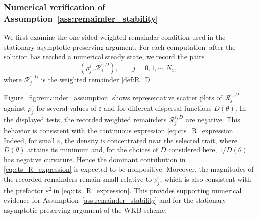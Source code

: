 \documentclass[11pt]{article}
\numberwithin{equation}{section}
\begin{document}
\subsubsection{Numerical verification of Assumption~\ref{ass:remainder_stability}}
\label{subsec:test_assumptions_new}

We first examine the one-sided weighted remainder condition used in the
stationary asymptotic-preserving argument.  
For each computation, after the solution has reached a numerical steady state,
we record the pairs
\[
    \left(\rho_j^\varepsilon,\mathcal R_j^{\varepsilon,D}\right),
    \qquad j=0, 1,\cdots, N_x, 
\]
where \(\mathcal R_j^{\varepsilon,D}\) is the weighted remainder \eqref{def:R_D}.


Figure~\ref{fig:remainder_assumption} shows representative scatter plots of
$\mathcal R_j^{\varepsilon,D}$ against $\rho_j^\varepsilon$ for several
values of $\varepsilon$ and for different dispersal functions $D(\theta)$.
In the displayed tests, the recorded weighted remainders
$\mathcal R_j^{\varepsilon,D}$ are negative.  This behavior is consistent with
the continuous expression \eqref{eq:cts_R_expression}.  Indeed, for small
$\varepsilon$, the density is concentrated near the selected trait, where
$D(\theta)$ attains its minimum and, for the choices of $D$ considered here,
$1/D(\theta)$ has negative curvature.  Hence the dominant contribution in
\eqref{eq:cts_R_expression} is expected to be nonpositive.  Moreover, the
magnitudes of the recorded remainders remain small relative to
$\rho_j^\varepsilon$, which is also consistent with the prefactor
$\varepsilon^2$ in \eqref{eq:cts_R_expression}.  This provides supporting
numerical evidence for Assumption~\ref{ass:remainder_stability} and for the
stationary asymptotic-preserving argument of the WKB scheme.
\end{document}
